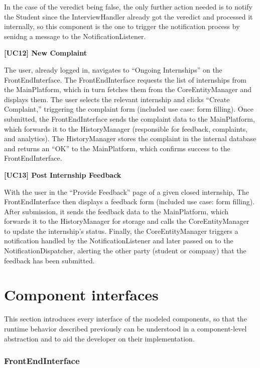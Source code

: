 In the case of the veredict being false, the only further action needed is to notify the Student since the InterviewHandler already got the veredict and processed it internally, so this component is the one to trigger the notification process by senidng a message to the NotificationListener.


\textbf{[UC12] New Complaint}

The user, already logged in, navigates to ``Ongoing Internships'' on the FrontEndInterface. The FrontEndInterface requests the list of internships from the MainPlatform, which in turn fetches them from the CoreEntityManager and displays them. The user selects the relevant internship and clicks ``Create Complaint,'' triggering the complaint form (included use case: form filling). Once submitted, the FrontEndInterface sends the complaint data to the MainPlatform, which forwards it to the HistoryManager (responsible for feedback, complaints, and analytics). The HistoryManager stores the complaint in the internal database and returns an ``OK'' to the MainPlatform, which confirms success to the FrontEndInterface.


\textbf{[UC13] Post Internship Feedback}

With the user in the ``Provide Feedback'' page of a given closed internship, The FrontEndInterface then displays a feedback form (included use case: form filling). After submission, it sends the feedback data to the MainPlatform, which forwards it to the HistoryManager for storage and calls the CoreEntityManager to update the internship’s status. Finally, the CoreEntityManager triggers a notification handled by the NotificationListener and later passed on to the NotificationDispatcher, alerting the other party (student or company) that the feedback has been submitted.



\section{Component interfaces}

This section introduces every interface of the modeled components, so that the runtime behavior described previously can be understood in a component-level abstraction and to aid the developer on their implementation.

\subsubsection{FrontEndInterface} 


